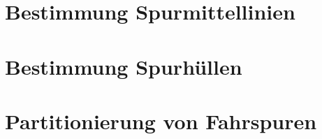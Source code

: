 \section{Bestimmung Spurmittellinien}
\label{sec:real2_define_lane_centerline}


\section{Bestimmung Spurhüllen}
\label{sec:real2_define_lane_envelope}


\section{Partitionierung von Fahrspuren}
\label{sec:real2_lane_partitioning}

